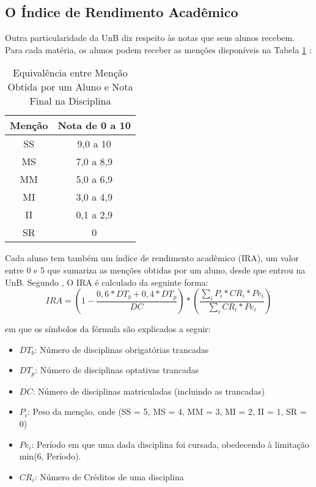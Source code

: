 \subsection{O Índice de Rendimento Acadêmico}
Outra particularidade da UnB diz respeito às notas que seus alunos recebem. Para cada
matéria, os alunos podem receber as menções disponíveis na Tabela \ref{mencao_unb} 
\cite{manual_calouro}: 

\begin{table}
\begin{center}
\begin{tabular}[c]{|c|c|}
    \hline
    \textbf{Menção} & \textbf{Nota de 0 a 10} \\
    \hline
    SS & 9,0 a 10 \\
    \hline
    MS & 7,0 a 8,9 \\
    \hline
    MM & 5,0 a 6,9 \\
    \hline
    MI & 3,0 a 4,9 \\
    \hline
    II & 0,1 a 2,9 \\
    \hline
    SR & 0 \\
    \hline
\end{tabular}
\end{center}
\caption{Equivalência entre Menção Obtida por um Aluno e Nota Final na Disciplina}
\label{mencao_unb}
\end{table}

Cada aluno tem também um índice de rendimento acadêmico (\acrshort{IRA}), um valor entre 0 e 5
que sumariza as menções obtidas por um aluno, desde que entrou na UnB. Segundo
\cite{manual_calouro}, O IRA é calculado da seguinte forma:  
\begin{equation}
    IRA = (1 - \frac{0,6 * DT_b + 0,4 * DT_p}{DC}) * 
    (\frac{\sum_{i}P_i * CR_i * Pe_i}{\sum_{i} CR_i * Pe_i})
\end{equation}

em que os símbolos da fórmula são explicados a seguir: 
\begin{itemize}
    \item $DT_b$: Número de disciplinas obrigatórias trancadas
    \item $DT_p$: Número de disciplinas optativas trancadas
    \item $DC$: Número de disciplinas matriculadas (incluindo as trancadas)
    \item $P_i$: Peso da menção, onde (SS = 5, MS = 4, MM = 3, MI = 2, II = 1, SR =
        0)
    \item $Pe_i$: Período em que uma dada disciplina foi cursada, obedecendo à
        limitação min(6, Período). 
    \item $CR_i$: Número de Créditos de uma disciplina
\end{itemize}

